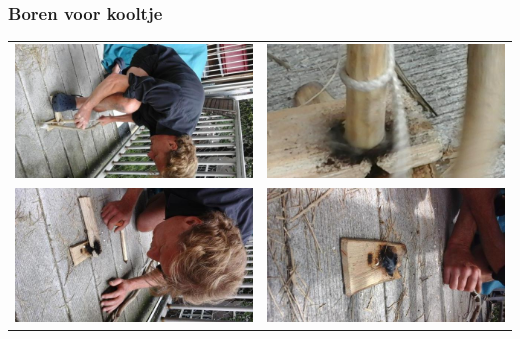 \documentclass[a4paper, handout]{beamer}
\begin{document}
\begin{frame}
	\frametitle{Boren voor kooltje}
	\begin{tabular}{ c c }
		\includegraphics[scale=0.18]{boren-1}
		&
		\includegraphics[scale=0.18]{boren-2}
		\\
		\includegraphics[scale=0.18]{boren-3}
		&
		\includegraphics[scale=0.18]{boren-4}

\end{tabular}
\end{frame}
\end{document}
